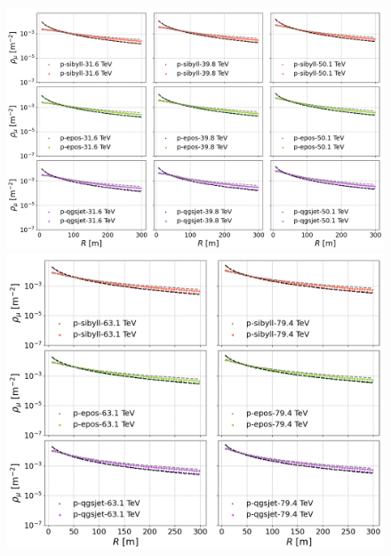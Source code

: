 \begin{figure}
	\includegraphics[width=\textwidth]{Figuras/lateraldist_wfits_16-18.png}
	\includegraphics[width=\textwidth]{Figuras/lateraldist_wfits_19-20.png}
\end{figure}

\singlespacing